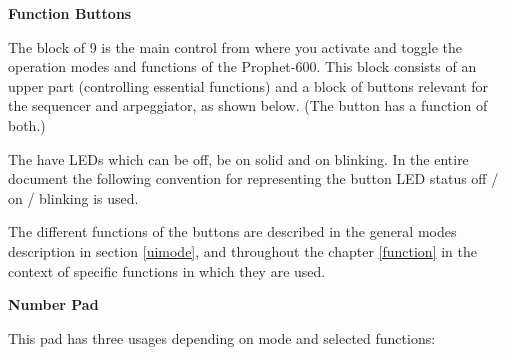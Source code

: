 \documentclass[landscape, 11pt, oneside, twoside]{report}
\newenvironment{flowtext}{\addmargin[0cm]{0cm}}{\endaddmargin} %
\begin{document}
\begin{flowtext}
\textbf{Function Buttons}

The block of 9 \funcbuttons is the main control from where you activate and toggle the operation modes and functions of the Prophet-600. This block consists of an upper part (controlling essential functions) and a block of buttons relevant for the sequencer and arpeggiator, as shown below. (The \record button has a function of both.)


The \funcbuttons have LEDs which can be off, be on solid and on blinking. In the entire document the following convention for representing the button LED status off / on / blinking is used.


The different functions of the buttons are described in the general modes description in section \ref{uimode}, and throughout the chapter \ref{function} in the context of specific functions in which they are used.

\textbf{Number Pad}

This pad has three usages depending on mode and selected functions:


\end{flowtext}
\end{document}
